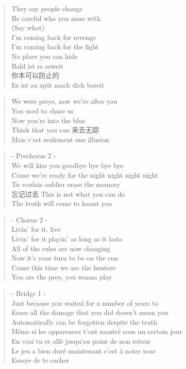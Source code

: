 \begin{verse}
They say people change\\
Be careful who you mess with \\
(Say what)\\
I'm coming back for revenge\\
I'm coming back for the fight\\
No place you can hide\\
Bald ist es soweit\\
你本可以防止的\\
Es ist zu spät mach dich bereit 
\end{verse}

\begin{verse}
We were preys, now we're after you\\
You used to chase us\\
Now you're into the blue\\
Think that you can 来去无踪 \\
Mais c'est seulement une illusion
\end{verse}

\begin{verse}
- Prechorus 2 -\\
We will kiss you goodbye bye bye bye\\
Cause we're ready for the night night night night\\
Tu voulais oublier erase the memory\\
忘记过去 This is not what you can do\\
The truth will come to haunt you
\end{verse}

\begin{verse}
- Chorus 2 -\\
Livin' for it, live \\
Livin' for it playin' as long as it lasts\\
All of the rules are now changing\\
Now it's your turn to be on the run\\
Cause this time we are the hunters \\
You are the prey, you wanna play
\end{verse}

\clearpage

\begin{verse}
- Bridge 1 -\\
Just because you waited for a number of years to \\
Erase all the damage that you did doesn't mean you\\
Automatically can be forgotten despite the truth\\
Même si les apparences t'ont  montré sous un certain jour\\
En vrai tu es allé jusqu'au point de non retour \\
Le jeu a bien duré maintenant c'est à notre tour\\
Essaye de te cacher 
\end{verse}

